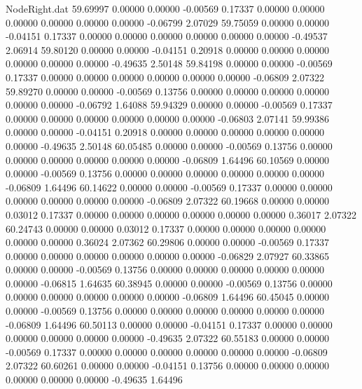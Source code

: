 \begin{filecontents}{NodeRight.dat}
  59.69997    0.00000    0.00000    -0.00569    0.17337    0.00000    0.00000    0.00000    0.00000    0.00000    0.00000   -0.06799    2.07029
  59.75059    0.00000    0.00000    -0.04151    0.17337    0.00000    0.00000    0.00000    0.00000    0.00000    0.00000   -0.49537    2.06914
  59.80120    0.00000    0.00000    -0.04151    0.20918    0.00000    0.00000    0.00000    0.00000    0.00000    0.00000   -0.49635    2.50148
  59.84198    0.00000    0.00000    -0.00569    0.17337    0.00000    0.00000    0.00000    0.00000    0.00000    0.00000   -0.06809    2.07322
  59.89270    0.00000    0.00000    -0.00569    0.13756    0.00000    0.00000    0.00000    0.00000    0.00000    0.00000   -0.06792    1.64088
  59.94329    0.00000    0.00000    -0.00569    0.17337    0.00000    0.00000    0.00000    0.00000    0.00000    0.00000   -0.06803    2.07141
  59.99386    0.00000    0.00000    -0.04151    0.20918    0.00000    0.00000    0.00000    0.00000    0.00000    0.00000   -0.49635    2.50148
  60.05485    0.00000    0.00000    -0.00569    0.13756    0.00000    0.00000    0.00000    0.00000    0.00000    0.00000   -0.06809    1.64496
  60.10569    0.00000    0.00000    -0.00569    0.13756    0.00000    0.00000    0.00000    0.00000    0.00000    0.00000   -0.06809    1.64496
  60.14622    0.00000    0.00000    -0.00569    0.17337    0.00000    0.00000    0.00000    0.00000    0.00000    0.00000   -0.06809    2.07322
  60.19668    0.00000    0.00000     0.03012    0.17337    0.00000    0.00000    0.00000    0.00000    0.00000    0.00000    0.36017    2.07322
  60.24743    0.00000    0.00000     0.03012    0.17337    0.00000    0.00000    0.00000    0.00000    0.00000    0.00000    0.36024    2.07362
  60.29806    0.00000    0.00000    -0.00569    0.17337    0.00000    0.00000    0.00000    0.00000    0.00000    0.00000   -0.06829    2.07927
  60.33865    0.00000    0.00000    -0.00569    0.13756    0.00000    0.00000    0.00000    0.00000    0.00000    0.00000   -0.06815    1.64635
  60.38945    0.00000    0.00000    -0.00569    0.13756    0.00000    0.00000    0.00000    0.00000    0.00000    0.00000   -0.06809    1.64496
  60.45045    0.00000    0.00000    -0.00569    0.13756    0.00000    0.00000    0.00000    0.00000    0.00000    0.00000   -0.06809    1.64496
  60.50113    0.00000    0.00000    -0.04151    0.17337    0.00000    0.00000    0.00000    0.00000    0.00000    0.00000   -0.49635    2.07322
  60.55183    0.00000    0.00000    -0.00569    0.17337    0.00000    0.00000    0.00000    0.00000    0.00000    0.00000   -0.06809    2.07322
  60.60261    0.00000    0.00000    -0.04151    0.13756    0.00000    0.00000    0.00000    0.00000    0.00000    0.00000   -0.49635    1.64496

\end{filecontents}
